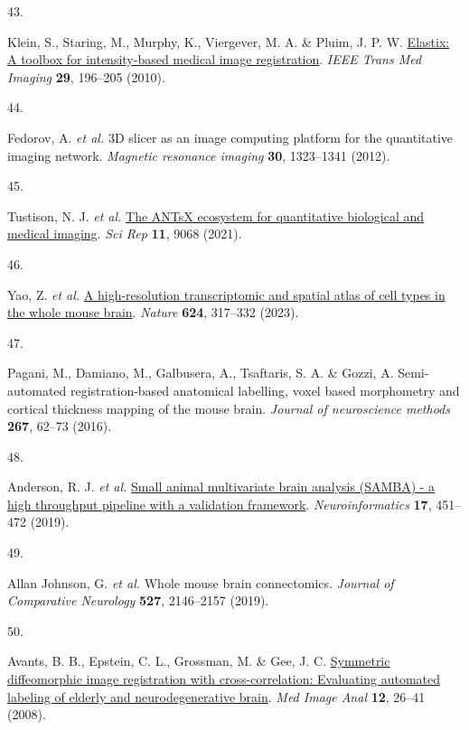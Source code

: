 \documentclass[
  12pt,
]{article}
\newlength{\cslhangindent}
\newlength{\csllabelwidth}
\newenvironment{CSLReferences}[2] %
 {\begin{list}{}{%
  \setlength{\itemindent}{0pt}
  \setlength{\leftmargin}{0pt}
  \setlength{\parsep}{0pt}
  \ifodd #1
   \setlength{\leftmargin}{\cslhangindent}
   \setlength{\itemindent}{-1\cslhangindent}
  \fi
  \setlength{\itemsep}{#2\baselineskip}}}
 {\end{list}}
\newcommand{\CSLLeftMargin}[1]{\parbox[t]{\csllabelwidth}{\strut#1\strut}}
\newcommand{\CSLRightInline}[1]{\parbox[t]{\linewidth - \csllabelwidth}{\strut#1\strut}}
\begin{document}
\begin{CSLReferences}{0}{0}
\CSLLeftMargin{43. }%
\CSLRightInline{Klein, S., Staring, M., Murphy, K., Viergever, M. A. \&
Pluim, J. P. W. \href{https://doi.org/10.1109/TMI.2009.2035616}{Elastix:
A toolbox for intensity-based medical image registration}. \emph{IEEE
Trans Med Imaging} \textbf{29}, 196--205 (2010).}

\CSLLeftMargin{44. }%
\CSLRightInline{Fedorov, A. \emph{et al.} 3D slicer as an image
computing platform for the quantitative imaging network. \emph{Magnetic
resonance imaging} \textbf{30}, 1323--1341 (2012).}

\CSLLeftMargin{45. }%
\CSLRightInline{Tustison, N. J. \emph{et al.}
\href{https://doi.org/10.1038/s41598-021-87564-6}{The ANTsX ecosystem
for quantitative biological and medical imaging}. \emph{Sci Rep}
\textbf{11}, 9068 (2021).}

\CSLLeftMargin{46. }%
\CSLRightInline{Yao, Z. \emph{et al.}
\href{https://doi.org/10.1038/s41586-023-06812-z}{A high-resolution
transcriptomic and spatial atlas of cell types in the whole mouse
brain}. \emph{Nature} \textbf{624}, 317--332 (2023).}

\CSLLeftMargin{47. }%
\CSLRightInline{Pagani, M., Damiano, M., Galbusera, A., Tsaftaris, S. A.
\& Gozzi, A. Semi-automated registration-based anatomical labelling,
voxel based morphometry and cortical thickness mapping of the mouse
brain. \emph{Journal of neuroscience methods} \textbf{267}, 62--73
(2016).}

\CSLLeftMargin{48. }%
\CSLRightInline{Anderson, R. J. \emph{et al.}
\href{https://doi.org/10.1007/s12021-018-9410-0}{Small animal
multivariate brain analysis (SAMBA) - a high throughput pipeline with a
validation framework}. \emph{Neuroinformatics} \textbf{17}, 451--472
(2019).}

\CSLLeftMargin{49. }%
\CSLRightInline{Allan Johnson, G. \emph{et al.} Whole mouse brain
connectomics. \emph{Journal of Comparative Neurology} \textbf{527},
2146--2157 (2019).}

\CSLLeftMargin{50. }%
\CSLRightInline{Avants, B. B., Epstein, C. L., Grossman, M. \& Gee, J.
C. \href{https://doi.org/10.1016/j.media.2007.06.004}{Symmetric
diffeomorphic image registration with cross-correlation: Evaluating
automated labeling of elderly and neurodegenerative brain}. \emph{Med
Image Anal} \textbf{12}, 26--41 (2008).}


\end{CSLReferences}
\end{document}
